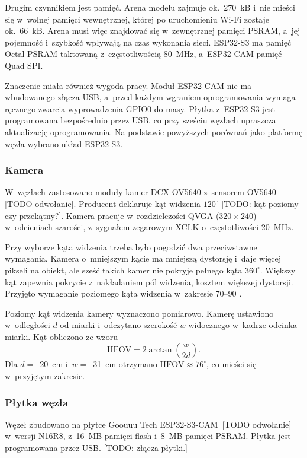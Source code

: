 Drugim czynnikiem jest pamięć. Arena modelu zajmuje ok.~270~kB i~nie
mieści się w~wolnej pamięci wewnętrznej, której po uruchomieniu Wi-Fi
zostaje ok.~66~kB. Arena musi więc znajdować się w~zewnętrznej pamięci
PSRAM, a~jej pojemność i~szybkość wpływają na czas wykonania sieci.
ESP32-S3 ma pamięć Octal PSRAM taktowaną z~częstotliwością 80~MHz,
a~ESP32-CAM pamięć Quad SPI.

Znaczenie miała również wygoda pracy. Moduł ESP32-CAM nie ma
wbudowanego złącza USB, a~przed każdym wgraniem oprogramowania wymaga
ręcznego zwarcia wyprowadzenia GPIO0 do masy. Płytka z~ESP32-S3 jest
programowana bezpośrednio przez USB, co przy sześciu węzłach upraszcza
aktualizację oprogramowania. Na podstawie powyższych porównań jako
platformę węzła wybrano układ ESP32-S3.

\subsubsection*{Kamera}

W~węzłach zastosowano moduły kamer DCX-OV5640 z~sensorem OV5640
[TODO odwołanie]. Producent deklaruje kąt widzenia $120^\circ$
[TODO: kąt poziomy czy przekątny?]. Kamera pracuje w~rozdzielczości
QVGA ($320 \times 240$) w~odcieniach szarości, z~sygnałem zegarowym
XCLK o~częstotliwości 20~MHz.

Przy wyborze kąta widzenia trzeba było pogodzić dwa przeciwstawne
wymagania. Kamera o~mniejszym kącie ma mniejszą dystorsję i~daje więcej
pikseli na obiekt, ale sześć takich kamer nie pokryje pełnego kąta
$360^\circ$. Większy kąt zapewnia pokrycie z~nakładaniem pól widzenia,
kosztem większej dystorsji. Przyjęto wymaganie poziomego kąta widzenia
w~zakresie $70$--$90^\circ$.

Poziomy kąt widzenia kamery wyznaczono pomiarowo. Kamerę ustawiono
w~odległości $d$ od miarki i~odczytano szerokość $w$ widocznego
w~kadrze odcinka miarki. Kąt obliczono ze wzoru
\begin{equation}
  \mathrm{HFOV} = 2 \arctan\left(\frac{w}{2d}\right).
  \label{eq:hfov-pomiar}
\end{equation}
Dla $d =$~20~cm i~$w =$~31~cm otrzymano
$\mathrm{HFOV} \approx 76^\circ$, co mieści się w~przyjętym zakresie.

\subsubsection*{Płytka węzła}

Węzeł zbudowano na płytce Goouuu Tech ESP32-S3-CAM~[TODO odwołanie]
w~wersji N16R8, z~16~MB pamięci flash i~8~MB pamięci PSRAM.
Płytka jest programowana przez USB. [TODO: złącza płytki.]

